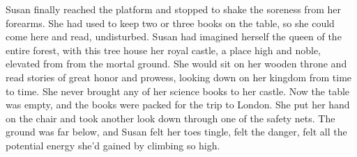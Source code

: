 \documentclass[openany, oneside]{book}
\begin{document}
Susan finally reached the platform and stopped to shake the soreness from her forearms.
She had used to keep two or three books on the table, so she could come here and read, undisturbed.
Susan had imagined herself the queen of the entire forest, with this tree house her royal castle, a place high and noble, elevated from from the mortal ground.
She would sit on her wooden throne and read stories of great honor and prowess, looking down on her kingdom from time to time.
She never brought any of her science books to her castle.
Now the table was empty, and the books were packed for the trip to London.
She put her hand on the chair and took another look down through one of the safety nets.
The ground was far below, and Susan felt her toes tingle, felt the danger, felt all the potential energy she'd gained by climbing so high.
\end{document}
